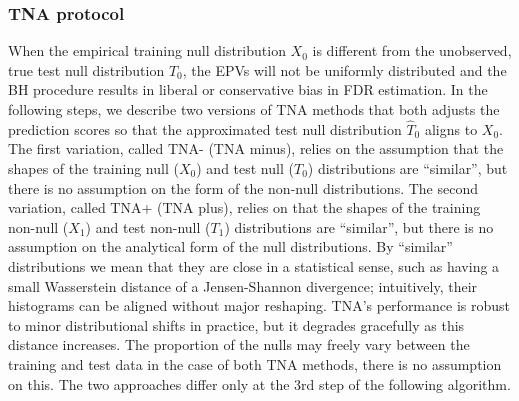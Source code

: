 \documentclass[10pt,letterpaper]{article}
\begin{document}
\subsubsection*{TNA protocol} When the empirical training null distribution $X_0$ is different from the unobserved, true test null distribution $T_0$, the EPVs will not be uniformly distributed and the BH procedure results in liberal or conservative bias in FDR estimation.
In the following steps, we describe two versions of TNA methods that both adjusts the prediction scores so that the approximated test null distribution $\hat{T}_0$ aligns to $X_0$.
The first variation, called TNA- (TNA minus), relies on the assumption that the shapes of the training null ($X_0$) and test null ($T_0$) distributions are ``similar'', but there is no assumption on the form of the non-null distributions.
The second variation, called TNA+ (TNA plus), relies on that the shapes of the training non-null ($X_1$) and test non-null ($T_1$) distributions are ``similar'', but there is no assumption on the analytical form of the null distributions.
By ``similar'' distributions we mean that they are close in a statistical sense, such as having a small Wasserstein distance of a Jensen-Shannon divergence; intuitively, their histograms can be aligned without major reshaping.
TNA's performance is robust to minor distributional shifts in practice, but it degrades gracefully as this distance increases.
The proportion of the nulls may freely vary between the training and test data in the case of both TNA methods, there is no assumption on this.
The two approaches differ only at the 3rd step of the following algorithm. 
\end{document}
